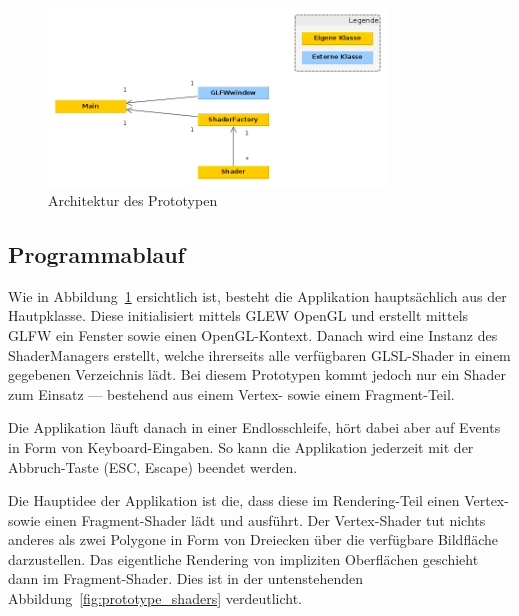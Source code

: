 \begin{figure}[H]
    \centering
    \includegraphics[width=0.8\textwidth]{img/prototype_class_diagram.png}
    \caption{Architektur des Prototypen\protect\footnotemark}\label{fig:prototype_architecture}
\end{figure}

\subsection{Programmablauf}
\label{subsec:program_sequence}

Wie in Abbildung~\ref{fig:prototype_architecture} ersichtlich ist, besteht
die Applikation hauptsächlich aus der Hautpklasse. Diese initialisiert
mittels GLEW OpenGL und erstellt mittels GLFW ein Fenster sowie einen
OpenGL-Kontext. Danach wird eine Instanz des ShaderManagers erstellt,
welche ihrerseits alle verfügbaren GLSL-Shader in einem gegebenen
Verzeichnis lädt. Bei diesem Prototypen kommt jedoch nur ein Shader zum
Einsatz --- bestehend aus einem Vertex- sowie einem Fragment-Teil.

Die Applikation läuft danach in einer Endlosschleife, hört dabei aber
auf Events in Form von Keyboard-Eingaben. So kann die Applikation
jederzeit mit der Abbruch-Taste (ESC, Escape) beendet werden.

Die Hauptidee der Applikation ist die, dass diese im Rendering-Teil
einen Vertex- sowie einen Fragment-Shader lädt und ausführt. Der
Vertex-Shader tut nichts anderes als zwei Polygone in Form von Dreiecken
über die verfügbare Bildfläche darzustellen. Das eigentliche Rendering
von impliziten Oberflächen geschieht dann im Fragment-Shader. Dies ist
in der untenstehenden Abbildung~\ref{fig:prototype_shaders} verdeutlicht.

